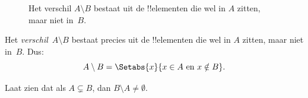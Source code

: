 \documentclass[../../../include/open-logic-section]{subfiles}
\begin{document}
\begin{figure}
  \caption{Het verschil $A \setminus B$ bestaat uit de !!{element}en die wel
    in $A$ zitten, maar niet in~$B$.}
\end{figure}

\begin{defn}[Verschil]
Het \emph{verschil}~$A \setminus B$ bestaat precies uit de !!{element}en die
wel in $A$ zitten, maar niet in~$B$. Dus:
\[
A\setminus B = \Setabs{x}{x\in A \text{ en } x \notin B}.
\]
\end{defn}

\begin{prob}
	Laat zien dat als $A \subsetneq B$, dan $B \setminus A \neq \emptyset$.
\end{prob}
\end{document}
